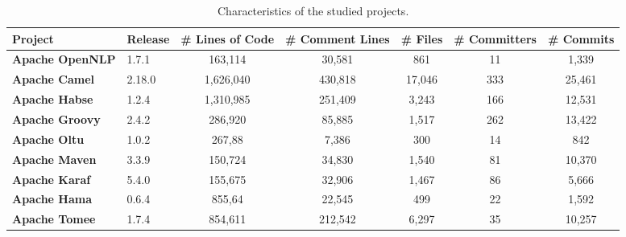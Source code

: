 \begin{landscape}


\begin{table}[htbp]
	\small
	\centering
	\caption{Characteristics of the studied projects.}
	\begin{adjustbox}{width=1.3\textwidth}


		\begin{tabular}{l|l|c|c|c|c|c}
			\hline
			\textbf{Project}           & \textbf{Release} & \textbf{\# Lines of Code} & \textbf{\# Comment Lines} & \textbf{\# Files} & \textbf{\# Committers} & \textbf{\# Commits} \\ \hline
			\textbf{Apache OpenNLP}    & 1.7.1            &          163,114           &           30,581           &        861        &           11           &        1,339         \\ \hline
			\textbf{Apache Camel}      & 2.18.0           &          1,626,040          &          430,818           &       17,046       &          333           &        25,461        \\ \hline
			\textbf{Apache Habse}      & ‎1.2.4           &          1,310,985          &          251,409           &       3,243        &          166           &        12,531        \\ \hline
			\textbf{Apache Groovy}     & 2.4.2            &          286,920           &           85,885           &       1,517        &          262           &        13,422        \\ \hline
			\textbf{Apache Oltu}       & 1.0.2            &           267,88           &           7,386            &        300        &           14            &         842         \\ \hline
			\textbf{Apache Maven}      & 3.3.9            &          150,724           &           34,830           &       1,540        &           81           &        10,370        \\ \hline
			\textbf{Apache Karaf}      & 5.4.0            &          155,675           &           32,906           &       1,467        &           86           &        5,666         \\ \hline
			\textbf{Apache Hama}       & 0.6.4            &           855,64           &           22,545           &        499        &           22           &        1,592         \\ \hline
			\textbf{Apache Tomee}      & 1.7.4            &          854,611           &          212,542           &       6,297        &           35           &        10,257        \\ \hline

\end{tabular}
\end{adjustbox}
\end{table}
\end{landscape}
